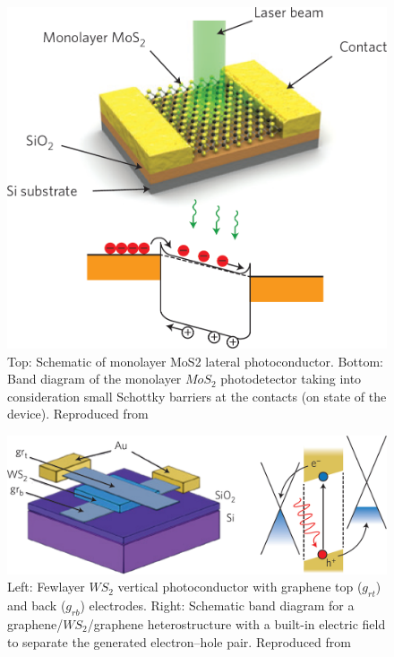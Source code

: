 \begin{figure}[!h]
	\begin{center}
		\includegraphics[scale=0.35]{PhotodetectorDiagram.png}
		\caption{Top: Schematic of monolayer MoS2 lateral photoconductor. Bottom: Band diagram of
the monolayer $MoS_2$ photodetector taking into consideration small Schottky barriers at the contacts (on state of the device). Reproduced from \cite{Mak2016}}
		\label{fig:PhotodetectorDiagram}
	\end{center}
\end{figure}

\begin{figure}[!h]
	\begin{center}
		\includegraphics[scale=0.25]{PhotoconductorDiagram.png}
		\caption{Left: Fewlayer $WS_2$ vertical photoconductor with graphene top ($g_{rt}$) and back ($g_{rb}$) electrodes. Right: Schematic band diagram for a graphene/$WS_2$/graphene heterostructure with a built-in electric field to separate the generated electron–hole pair. Reproduced from \cite{Mak2016}}
		\label{fig:PhotoconductorDiagram}
	\end{center}
\end{figure}

